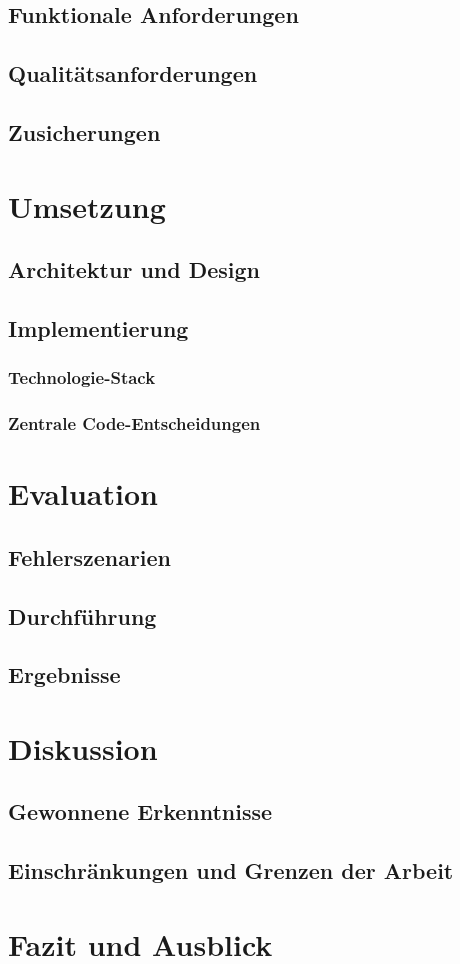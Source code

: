 \documentclass[11pt,a4paper]{scrreprt}
\begin{document}
    \section{Funktionale Anforderungen}
    \section{Qualitätsanforderungen}
    \section{Zusicherungen}

    \chapter{Umsetzung}
    \section{Architektur und Design}
    \section{Implementierung}
    \subsection{Technologie-Stack}
    \subsection{Zentrale Code-Entscheidungen}

    \chapter{Evaluation}
    \section{Fehlerszenarien}
    \section{Durchführung}
    \section{Ergebnisse}

    \chapter{Diskussion}
    \section{Gewonnene Erkenntnisse}
    \section{Einschränkungen und Grenzen der Arbeit}

    \chapter{Fazit und Ausblick}
\end{document}
